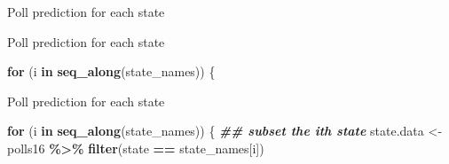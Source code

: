 \documentclass[
  ignorenonframetext,
]{beamer}
\newenvironment{Shaded}{\begin{snugshade}}{\end{snugshade}}
\newcommand{\ConstantTok}[1]{\textcolor[rgb]{0.56,0.35,0.01}{#1}}
\newcommand{\ControlFlowTok}[1]{\textcolor[rgb]{0.13,0.29,0.53}{\textbf{#1}}}
\newcommand{\DecValTok}[1]{\textcolor[rgb]{0.00,0.00,0.81}{#1}}
\newcommand{\DocumentationTok}[1]{\textcolor[rgb]{0.56,0.35,0.01}{\textbf{\textit{#1}}}}
\newcommand{\FunctionTok}[1]{\textcolor[rgb]{0.13,0.29,0.53}{\textbf{#1}}}
\newcommand{\NormalTok}[1]{#1}
\newcommand{\OtherTok}[1]{\textcolor[rgb]{0.56,0.35,0.01}{#1}}
\newcommand{\SpecialCharTok}[1]{\textcolor[rgb]{0.81,0.36,0.00}{\textbf{#1}}}
\begin{document}
\begin{frame}[fragile,t]{Poll prediction for each state}
\label{poll-prediction-for-each-state}
\footnotesize

\begin{Shaded}
\end{Shaded}
\end{frame}

\begin{frame}[fragile,t]{Poll prediction for each state}
\label{poll-prediction-for-each-state-1}
\footnotesize

\begin{Shaded}
\begin{Highlighting}[]
\ControlFlowTok{for}\NormalTok{ (i }\ControlFlowTok{in} \FunctionTok{seq\_along}\NormalTok{(state\_names)) \{}
\end{Highlighting}
\end{Shaded}
\end{frame}

\begin{frame}[fragile,t]{Poll prediction for each state}
\label{poll-prediction-for-each-state-2}
\footnotesize

\begin{Shaded}
\begin{Highlighting}[]
\ControlFlowTok{for}\NormalTok{ (i }\ControlFlowTok{in} \FunctionTok{seq\_along}\NormalTok{(state\_names)) \{}
  \DocumentationTok{\#\# subset the ith state}
\NormalTok{  state.data }\OtherTok{\textless{}{-}}\NormalTok{ polls16 }\SpecialCharTok{\%\textgreater{}\%}
    \FunctionTok{filter}\NormalTok{(state }\SpecialCharTok{==}\NormalTok{ state\_names[i])}
\end{Highlighting}
\end{Shaded}
\end{frame}
\end{document}
